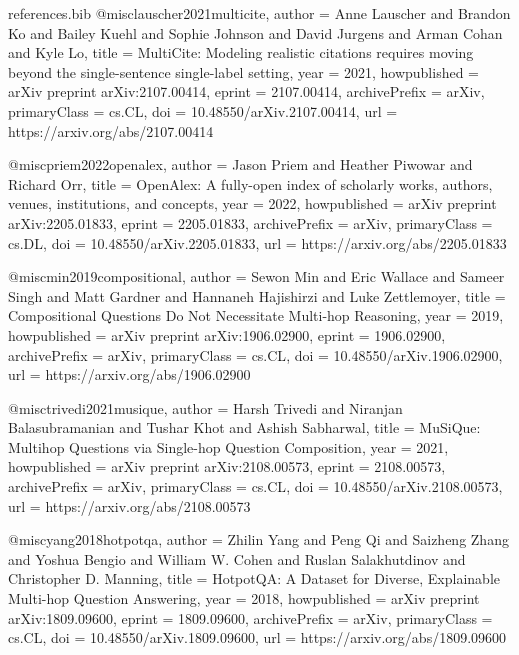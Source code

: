 \begin{filecontents*}{references.bib}
@misc{lauscher2021multicite,
  author        = {Anne Lauscher and Brandon Ko and Bailey Kuehl and Sophie Johnson and David Jurgens and Arman Cohan and Kyle Lo},
  title         = {{MultiCite: Modeling realistic citations requires moving beyond the single-sentence single-label setting}},
  year          = {2021},
  howpublished  = {arXiv preprint arXiv:2107.00414},
  eprint        = {2107.00414},
  archivePrefix = {arXiv},
  primaryClass  = {cs.CL},
  doi           = {10.48550/arXiv.2107.00414},
  url           = {https://arxiv.org/abs/2107.00414}
}

@misc{priem2022openalex,
  author        = {Jason Priem and Heather Piwowar and Richard Orr},
  title         = {{OpenAlex: A fully-open index of scholarly works, authors, venues, institutions, and concepts}},
  year          = {2022},
  howpublished  = {arXiv preprint arXiv:2205.01833},
  eprint        = {2205.01833},
  archivePrefix = {arXiv},
  primaryClass  = {cs.DL},
  doi           = {10.48550/arXiv.2205.01833},
  url           = {https://arxiv.org/abs/2205.01833}
}



@misc{min2019compositional,
  author        = {Sewon Min and Eric Wallace and Sameer Singh and Matt Gardner and Hannaneh Hajishirzi and Luke Zettlemoyer},
  title         = {{Compositional Questions Do Not Necessitate Multi-hop Reasoning}},
  year          = {2019},
  howpublished  = {arXiv preprint arXiv:1906.02900},
  eprint        = {1906.02900},
  archivePrefix = {arXiv},
  primaryClass  = {cs.CL},
  doi           = {10.48550/arXiv.1906.02900},
  url           = {https://arxiv.org/abs/1906.02900}
}

@misc{trivedi2021musique,
  author        = {Harsh Trivedi and Niranjan Balasubramanian and Tushar Khot and Ashish Sabharwal},
  title         = {{MuSiQue: Multihop Questions via Single-hop Question Composition}},
  year          = {2021},
  howpublished  = {arXiv preprint arXiv:2108.00573},
  eprint        = {2108.00573},
  archivePrefix = {arXiv},
  primaryClass  = {cs.CL},
  doi           = {10.48550/arXiv.2108.00573},
  url           = {https://arxiv.org/abs/2108.00573}
}

@misc{yang2018hotpotqa,
  author        = {Zhilin Yang and Peng Qi and Saizheng Zhang and Yoshua Bengio and William W. Cohen and Ruslan Salakhutdinov and Christopher D. Manning},
  title         = {{HotpotQA: A Dataset for Diverse, Explainable Multi-hop Question Answering}},
  year          = {2018},
  howpublished  = {arXiv preprint arXiv:1809.09600},
  eprint        = {1809.09600},
  archivePrefix = {arXiv},
  primaryClass  = {cs.CL},
  doi           = {10.48550/arXiv.1809.09600},
  url           = {https://arxiv.org/abs/1809.09600}
}


\end{filecontents*}
